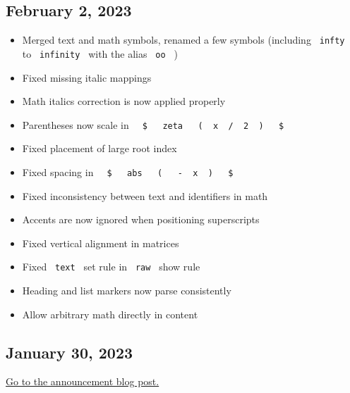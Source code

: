 \subsection{February 2, 2023}\label{february-2-2023}

\begin{itemize}
\tightlist
\item
  Merged text and math symbols, renamed a few symbols (including
  \texttt{\ infty\ } to \texttt{\ infinity\ } with the alias
  \texttt{\ oo\ } )
\item
  Fixed missing italic mappings
\item
  Math italics correction is now applied properly
\item
  Parentheses now scale in
  \texttt{\ }{\texttt{\ \$\ }}\texttt{\ }{\texttt{\ zeta\ }}\texttt{\ }{\texttt{\ (\ }}\texttt{\ x\ }{\texttt{\ /\ }}\texttt{\ 2\ }{\texttt{\ )\ }}\texttt{\ }{\texttt{\ \$\ }}\texttt{\ }
\item
  Fixed placement of large root index
\item
  Fixed spacing in
  \texttt{\ }{\texttt{\ \$\ }}\texttt{\ }{\texttt{\ abs\ }}\texttt{\ }{\texttt{\ (\ }}\texttt{\ }{\texttt{\ -\ }}\texttt{\ x\ }{\texttt{\ )\ }}\texttt{\ }{\texttt{\ \$\ }}\texttt{\ }
\item
  Fixed inconsistency between text and identifiers in math
\item
  Accents are now ignored when positioning superscripts
\item
  Fixed vertical alignment in matrices
\item
  Fixed \texttt{\ text\ } set rule in \texttt{\ raw\ } show rule
\item
  Heading and list markers now parse consistently
\item
  Allow arbitrary math directly in content
\end{itemize}

\subsection{January 30, 2023}\label{january-30-2023}

\href{https://typst.app/blog/2023/january-update}{Go to the announcement
blog post.}

